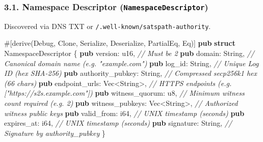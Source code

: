 \documentclass[
]{article}
\newenvironment{Shaded}{}{}
\newcommand{\AttributeTok}[1]{\textcolor[rgb]{0.49,0.56,0.16}{#1}}
\newcommand{\BuiltInTok}[1]{\textcolor[rgb]{0.00,0.50,0.00}{#1}}
\newcommand{\CommentTok}[1]{\textcolor[rgb]{0.38,0.63,0.69}{\textit{#1}}}
\newcommand{\DataTypeTok}[1]{\textcolor[rgb]{0.56,0.13,0.00}{#1}}
\newcommand{\KeywordTok}[1]{\textcolor[rgb]{0.00,0.44,0.13}{\textbf{#1}}}
\newcommand{\NormalTok}[1]{#1}
\newcommand{\OperatorTok}[1]{\textcolor[rgb]{0.40,0.40,0.40}{#1}}
\begin{document}
\hypertarget{namespace-descriptor-namespacedescriptor}{%
\subsubsection{\texorpdfstring{3.1. Namespace Descriptor
(\texttt{NamespaceDescriptor})}{3.1. Namespace Descriptor (NamespaceDescriptor)}}\label{namespace-descriptor-namespacedescriptor}}

Discovered via DNS TXT or \texttt{/.well-known/satspath-authority}.

\begin{Shaded}
\begin{Highlighting}[]
\AttributeTok{\#[}\NormalTok{derive}\AttributeTok{(}\BuiltInTok{Debug}\OperatorTok{,} \BuiltInTok{Clone}\OperatorTok{,}\NormalTok{ Serialize}\OperatorTok{,}\NormalTok{ Deserialize}\OperatorTok{,} \BuiltInTok{PartialEq}\OperatorTok{,} \BuiltInTok{Eq}\AttributeTok{)]}
\KeywordTok{pub} \KeywordTok{struct}\NormalTok{ NamespaceDescriptor }\OperatorTok{\{}
    \KeywordTok{pub}\NormalTok{ version}\OperatorTok{:} \DataTypeTok{u16}\OperatorTok{,}                    \CommentTok{// Must be 2}
    \KeywordTok{pub}\NormalTok{ domain}\OperatorTok{:} \DataTypeTok{String}\OperatorTok{,}                  \CommentTok{// Canonical domain name (e.g. "example.com")}
    \KeywordTok{pub}\NormalTok{ log\_id}\OperatorTok{:} \DataTypeTok{String}\OperatorTok{,}                  \CommentTok{// Unique Log ID (hex SHA{-}256)}
    \KeywordTok{pub}\NormalTok{ authority\_pubkey}\OperatorTok{:} \DataTypeTok{String}\OperatorTok{,}        \CommentTok{// Compressed secp256k1 hex (66 chars)}
    \KeywordTok{pub}\NormalTok{ endpoint\_urls}\OperatorTok{:} \DataTypeTok{Vec}\OperatorTok{\textless{}}\DataTypeTok{String}\OperatorTok{\textgreater{},}      \CommentTok{// HTTPS endpoints (e.g. ["https://s2s.example.com"])}
    \KeywordTok{pub}\NormalTok{ witness\_quorum}\OperatorTok{:} \DataTypeTok{u8}\OperatorTok{,}              \CommentTok{// Minimum witness count required (e.g. 2)}
    \KeywordTok{pub}\NormalTok{ witness\_pubkeys}\OperatorTok{:} \DataTypeTok{Vec}\OperatorTok{\textless{}}\DataTypeTok{String}\OperatorTok{\textgreater{},}    \CommentTok{// Authorized witness public keys}
    \KeywordTok{pub}\NormalTok{ valid\_from}\OperatorTok{:} \DataTypeTok{i64}\OperatorTok{,}                 \CommentTok{// UNIX timestamp (seconds)}
    \KeywordTok{pub}\NormalTok{ expires\_at}\OperatorTok{:} \DataTypeTok{i64}\OperatorTok{,}                 \CommentTok{// UNIX timestamp (seconds)}
    \KeywordTok{pub}\NormalTok{ signature}\OperatorTok{:} \DataTypeTok{String}\OperatorTok{,}               \CommentTok{// Signature by authority\_pubkey}
\OperatorTok{\}}
\end{Highlighting}
\end{Shaded}
\end{document}
